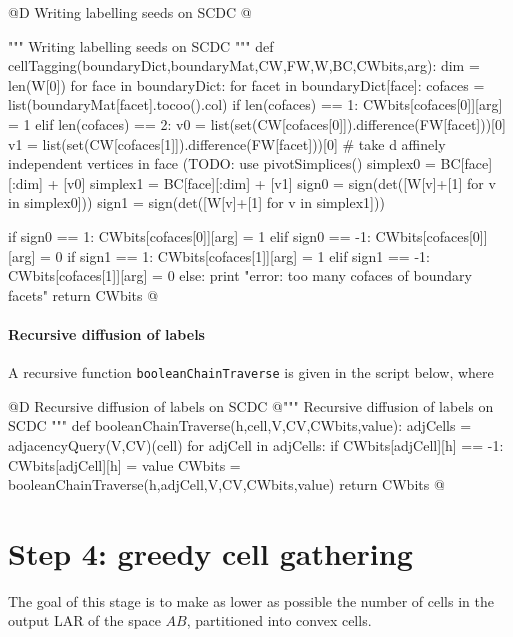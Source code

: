 \documentclass[11pt,oneside]{article}	%
\begin{document}
@D Writing labelling seeds on SCDC
@{""" Writing labelling seeds on SCDC """
def cellTagging(boundaryDict,boundaryMat,CW,FW,W,BC,CWbits,arg):
	dim = len(W[0])
	for face in boundaryDict:
		for facet in boundaryDict[face]:
			cofaces = list(boundaryMat[facet].tocoo().col)
			if len(cofaces) == 1: 
				CWbits[cofaces[0]][arg] = 1
			elif len(cofaces) == 2:
				v0 = list(set(CW[cofaces[0]]).difference(FW[facet]))[0]
				v1 = list(set(CW[cofaces[1]]).difference(FW[facet]))[0]
				# take d affinely independent vertices in face (TODO: use pivotSimplices() 
				simplex0 = BC[face][:dim] + [v0]
				simplex1 = BC[face][:dim] + [v1]
				sign0 = sign(det([W[v]+[1] for v in simplex0]))
				sign1 = sign(det([W[v]+[1] for v in simplex1]))
				
				if sign0 == 1: CWbits[cofaces[0]][arg] = 1
				elif sign0 == -1: CWbits[cofaces[0]][arg] = 0
				if sign1 == 1: CWbits[cofaces[1]][arg] = 1
				elif sign1 == -1: CWbits[cofaces[1]][arg] = 0
			else: 
				print "error: too many cofaces of boundary facets"
	return CWbits
@}


\paragraph{Recursive diffusion of labels}
A recursive function \texttt{booleanChainTraverse} is given in the script below, where 

@D Recursive diffusion of labels on SCDC
@{""" Recursive diffusion of labels on SCDC """
def booleanChainTraverse(h,cell,V,CV,CWbits,value):
	adjCells = adjacencyQuery(V,CV)(cell)
	for adjCell in adjCells: 
		if CWbits[adjCell][h] == -1:
			CWbits[adjCell][h] = value
			CWbits = booleanChainTraverse(h,adjCell,V,CV,CWbits,value)
	return CWbits
@}



\section{Step 4: greedy cell gathering}

The goal of this stage is to make as lower as possible the number of cells in the  output LAR of the space $AB$, partitioned into convex cells.
\end{document}
